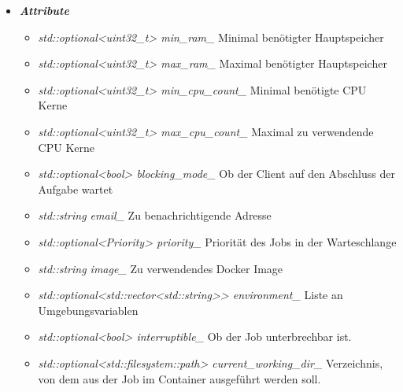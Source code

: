 \documentclass[a4paper,12pt]{article}
\begin{document}
\begin{itemize}[label={}]

	\item \textit{\textbf{Attribute}}
		\begin{itemize}[label={\textbullet}]
			\item \textit{std::optional<uint32\_t> min\_ram\_} Minimal benötigter Hauptspeicher
			\item \textit{std::optional<uint32\_t> max\_ram\_} Maximal benötigter Hauptspeicher
			\item \textit{std::optional<uint32\_t> min\_cpu\_count\_} Minimal benötigte CPU Kerne
			\item \textit{std::optional<uint32\_t> max\_cpu\_count\_} Maximal zu verwendende CPU Kerne
			\item \textit{std::optional<bool> blocking\_mode\_} Ob der Client auf den Abschluss der Aufgabe wartet
			\item \textit{std::string email\_} Zu benachrichtigende Adresse
			\item \textit{std::optional<Priority> priority\_} Priorität des Jobs in der Warteschlange
			\item \textit{std::string image\_} Zu verwendendes Docker Image
			\item \textit{std::optional<std::vector<std::string>> environment\_} Liste an Umgebungsvariablen
			\item \textit{std::optional<bool> interruptible\_} Ob der Job unterbrechbar ist.
			\item \textit{std::optional<std::filesystem::path> current\_working\_dir\_} Verzeichnis, von dem aus der Job im Container ausgeführt werden soll.
		\end{itemize}


\end{itemize}
\end{document}
